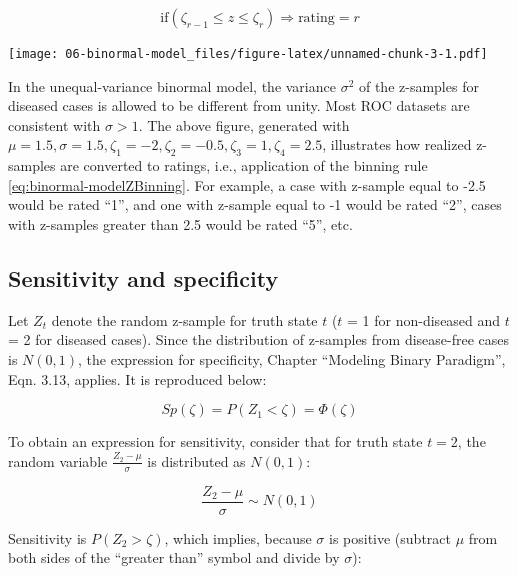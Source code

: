 \documentclass[
]{book}
\begin{document}
\begin{equation} 
\text{if} \left (\zeta_{r-1} \le z \le \zeta_r  \right )\Rightarrow \text {rating} = r
\label{eq:binormal-modelZBinning}
\end{equation}

\texttt{[image: 06-binormal-model\_files/figure-latex/unnamed-chunk-3-1.pdf]}

In the unequal-variance binormal model, the variance \(\sigma^2\) of the z-samples for diseased cases is allowed to be different from unity. Most ROC datasets are consistent with \(\sigma > 1\). The above figure, generated with \(\mu = 1.5, \sigma = 1.5, \zeta_1 = -2, \zeta_2 = -0.5, \zeta_3 = 1, \zeta_4 = 2.5\), illustrates how realized z-samples are converted to ratings, i.e., application of the binning rule \eqref{eq:binormal-modelZBinning}. For example, a case with z-sample equal to -2.5 would be rated ``1'', and one with z-sample equal to -1 would be rated ``2'', cases with z-samples greater than 2.5 would be rated ``5'', etc.

\hypertarget{sensitivity-and-specificity-1}{%
\subsection{Sensitivity and specificity}\label{sensitivity-and-specificity-1}}

Let \(Z_t\) denote the random z-sample for truth state \(t\) (\(t\) = 1 for non-diseased and \(t\) = 2 for diseased cases). Since the distribution of z-samples from disease-free cases is \(N(0,1)\), the expression for specificity, Chapter ``Modeling Binary Paradigm'', Eqn. 3.13, applies. It is reproduced below:

\begin{equation} 
Sp\left ( \zeta \right )=P\left ( Z_1 < \zeta \right )=\Phi\left ( \zeta \right )
\label{eq:binormal-modelSp}
\end{equation}

To obtain an expression for sensitivity, consider that for truth state \(t = 2\), the random variable \(\frac{Z_2-\mu}{\sigma}\) is distributed as \(N(0,1)\):

\begin{equation*} 
\frac{Z_2-\mu}{\sigma}\sim N\left ( 0,1 \right )
\end{equation*}

Sensitivity is \(P\left ( Z_2 > \zeta \right )\), which implies, because \(\sigma\) is positive (subtract \(\mu\) from both sides of the ``greater than'' symbol and divide by \(\sigma\)):
\end{document}
